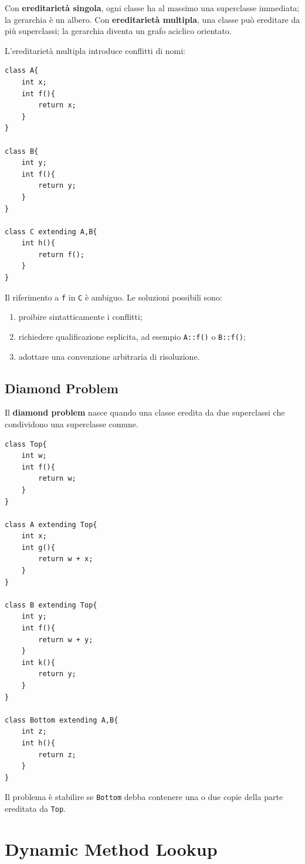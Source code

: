 \documentclass{article}
\begin{document}
Con \textbf{ereditarietà singola}, ogni classe ha al massimo una superclasse immediata; la gerarchia è un albero. Con \textbf{ereditarietà multipla}, una classe può ereditare da più superclassi; la gerarchia diventa un grafo aciclico orientato.

L'ereditarietà multipla introduce conflitti di nomi:

\begin{lstlisting}
class A{
    int x;
    int f(){
        return x;
    }
}

class B{
    int y;
    int f(){
        return y;
    }
}

class C extending A,B{
    int h(){
        return f();
    }
}
\end{lstlisting}

Il riferimento a \texttt{f} in \texttt{C} è ambiguo. Le soluzioni possibili sono:
\begin{enumerate}
  \item proibire sintatticamente i conflitti;
  \item richiedere qualificazione esplicita, ad esempio \texttt{A::f()} o \texttt{B::f()};
  \item adottare una convenzione arbitraria di risoluzione.
\end{enumerate}

\subsection{Diamond Problem}

Il \textbf{diamond problem} nasce quando una classe eredita da due superclassi che condividono una superclasse comune.

\begin{lstlisting}
class Top{
    int w;
    int f(){
        return w;
    }
}

class A extending Top{
    int x;
    int g(){
        return w + x;
    }
}

class B extending Top{
    int y;
    int f(){
        return w + y;
    }
    int k(){
        return y;
    }
}

class Bottom extending A,B{
    int z;
    int h(){
        return z;
    }
}
\end{lstlisting}

Il problema è stabilire se \texttt{Bottom} debba contenere una o due copie della parte ereditata da \texttt{Top}.

\section{Dynamic Method Lookup}
\end{document}
